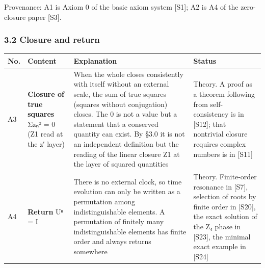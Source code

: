 \documentclass[
  a4paper,
]{article}
\newcounter{none} %
\begin{document}
Provenance: A1 is Axiom 0 of the basic axiom system {[}S1{]}; A2 is A4
of the zero-closure paper {[}S3{]}.

\subsubsection{3.2 Closure and return}\label{closure-and-return}

{\def\LTcaptype{none} %
\begin{longtable}[]{@{}
  >{\raggedright\arraybackslash}p{}
  >{\raggedright\arraybackslash}p{}
  >{\raggedright\arraybackslash}p{}
  >{\raggedright\arraybackslash}p{}@{}}
\toprule\noalign{}
\begin{minipage}[b]{\linewidth}\raggedright
No.
\end{minipage} & \begin{minipage}[b]{\linewidth}\raggedright
Content
\end{minipage} & \begin{minipage}[b]{\linewidth}\raggedright
Explanation
\end{minipage} & \begin{minipage}[b]{\linewidth}\raggedright
Status
\end{minipage} \\
\midrule\noalign{}
\endhead
\bottomrule\noalign{}
\endlastfoot
A3 & \textbf{Closure of true squares} Σzₙ² = 0 (Z1 read at the z′ layer)
& When the whole closes consistently with itself without an external
scale, the sum of true squares (squares without conjugation) closes. The
0 is not a value but a statement that a conserved quantity can exist. By
§3.0 it is not an independent definition but the reading of the linear
closure Z1 at the layer of squared quantities & Theory. A proof as a
theorem following from self-consistency is in {[}S12{]}; that nontrivial
closure requires complex numbers is in {[}S11{]} \\
A4 & \textbf{Return} Uⁿ = I & There is no external clock, so time
evolution can only be written as a permutation among indistinguishable
elements. A permutation of finitely many indistinguishable elements has
finite order and always returns somewhere & Theory. Finite-order
resonance in {[}S7{]}, selection of roots by finite order in {[}S20{]},
the exact solution of the Z₄ phase in {[}S23{]}, the minimal exact
example in {[}S24{]} \\
\end{longtable}
}
\end{document}

